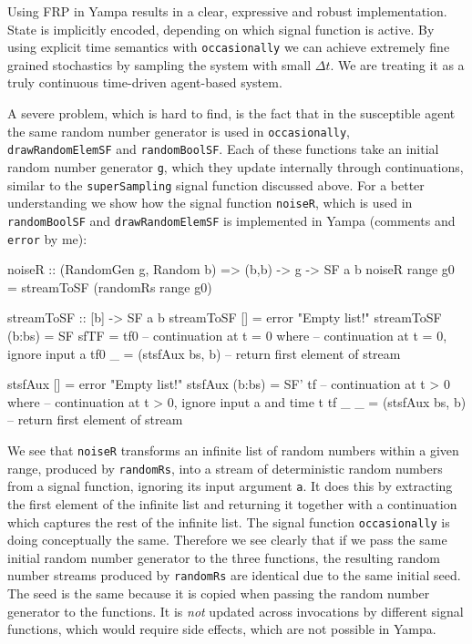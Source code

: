 Using FRP in Yampa results in a clear, expressive and robust implementation. State is implicitly encoded, depending on which signal function is active. By using explicit time semantics with \texttt{occasionally} we can achieve extremely fine grained stochastics by sampling the system with small $\Delta t$. We are treating it as a truly continuous time-driven agent-based system.

A severe problem, which is hard to find, is the fact that in the susceptible agent the same random number generator is used in \texttt{occasionally}, \\ \texttt{drawRandomElemSF} and \texttt{randomBoolSF}. Each of these functions take an initial random number generator \texttt{g}, which they update internally through continuations, similar to the \texttt{superSampling} signal function discussed above. For a better understanding we show how the signal function \texttt{noiseR}, which is used in \texttt{randomBoolSF} and \texttt{drawRandomElemSF} is implemented in Yampa (comments and \texttt{error} by me):

\begin{HaskellCode}
noiseR :: (RandomGen g, Random b) => (b,b) -> g -> SF a b
noiseR range g0 = streamToSF (randomRs range g0)

streamToSF :: [b] -> SF a b
streamToSF []     = error "Empty list!"
streamToSF (b:bs) = SF {sfTF = tf0} -- continuation at t = 0
  where
    -- continuation at t = 0, ignore input a
    tf0 _ = (stsfAux bs, b) -- return first element of stream
    
    stsfAux []     = error "Empty list!"
    stsfAux (b:bs) = SF' tf -- continuation at t > 0
      where
        -- continuation at t > 0, ignore input a and time t
        tf _ _ = (stsfAux bs, b) -- return first element of stream
\end{HaskellCode}

We see that \texttt{noiseR} transforms an infinite list of random numbers within a given range, produced by \texttt{randomRs}, into a stream of deterministic random numbers from a signal function, ignoring its input argument \texttt{a}. It does this by extracting the first element of the infinite list and returning it together with a continuation which captures the rest of the infinite list. The signal function \texttt{occasionally} is doing conceptually the same. Therefore we see clearly that if we pass the same initial random number generator to the three functions, the resulting random number streams produced by \texttt{randomRs} are identical due to the same initial seed. The seed is the same because it is copied when passing the random number generator to the functions. It is \textit{not} updated across invocations by different signal functions, which would require side effects, which are not possible in Yampa.

